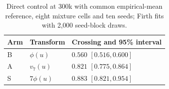 \begin{table}[t]
\centering\small
\caption{Direct control at 300k with common empirical-mean reference, eight mixture cells and ten seeds; Firth fits with 2,000 seed-block draws.}
\label{tab:confirmed_control}
\begin{tabular}{@{}lll@{}}\toprule
Arm & Transform & Crossing and 95\% interval \\
\midrule
B & $\phi(u)$ & $0.560$ $[0.516,0.600]$ \\
A & $v_7(u)$ & $0.821$ $[0.775,0.864]$ \\
S & $7\phi(u)$ & $0.883$ $[0.821,0.954]$ \\
\bottomrule\end{tabular}
\end{table}
